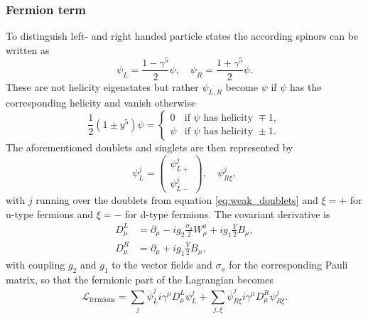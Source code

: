 \subsubsection*{Fermion term}
To distinguish left- and right handed particle states the according spinors can be written as
\begin{equation}
    \psi_L=\frac{1-\gamma^5}{2}\psi, \quad \psi_R=\frac{1+\gamma^5}{2}\psi.
\end{equation}
These are not helicity eigenstates but rather $\psi_{L,R}$ become $\psi$ if $\psi$ has the corresponding helicity and vanish otherwise
\begin{equation}
    \frac{1}{2}(1 \pm y^5)\psi =
    \begin{cases}
        0    & \text{if } \psi \text{ has helicity } \mp1, \\
        \psi & \text{if } \psi \text{ has helicity } \pm1.
    \end{cases}\label{eq:left_handed_state}
\end{equation}
The aforementioned doublets and singlets are then represented by
\begin{equation}
    \psi_L^j=
    \begin{pmatrix}
        \psi_{L+}^j \\ \psi_{L-}^j
    \end{pmatrix},
    \quad \psi_{R\xi}^j,
\end{equation}
with $j$ running over the doublets from equation \ref{eq:weak_doublets} and $\xi=+$ for u-type fermions and $\xi=-$ for d-type fermions.
The covariant derivative is
\begin{align}
    D_\mu^L & =\partial_\mu- i g_2 \frac{{\sigma}_a}{2}W_\mu^a+i g_1\frac{Y}{2}B_\mu, \label{eq:cov_diff_L} \\
    D_\mu^R & =\partial_\mu+ i g_1\frac{Y}{2}B_\mu,
\end{align}
with coupling $g_2$ and $g_1$ to the vector fields and $\sigma_a$ for the corresponding Pauli matrix, so that the fermionic part of the Lagrangian becomes
\begin{equation}
    \mathcal {L}_\text{fermions} = \sum_j\overline{\psi}^j_L i \gamma^\mu D_\mu^L\psi_L^j+\sum_{j,\xi}\overline{\psi}^j_{R\xi} i \gamma^\mu D_\mu^R\psi_{R\xi}^j.
    \label{eq:L_fermion}
\end{equation}

